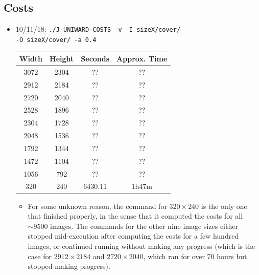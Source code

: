 \documentclass[11pt,a4paper]{report}
\begin{document}
\subsection{Costs}
\begin{itemize}
\item 10/11/18: \texttt{./J-UNIWARD-COSTS -v -I sizeX/cover/} \\
         \texttt{-O sizeX/cover/ -a 0.4}
  \begin{center}
  \begin{tabular}{ c c | c c }
  Width & Height & Seconds & Approx. Time \\ \hline
  3072 & 2304 & ?? & ?? \\  %
  2912 & 2184 & ?? & ?? \\  %
  2720 & 2040 & ?? & ?? \\  %
  2528 & 1896 & ?? & ?? \\  %
  2304 & 1728 & ?? & ?? \\  %
  2048 & 1536 & ?? & ?? \\  %
  1792 & 1344 & ?? & ?? \\  %
  1472 & 1104 & ?? & ?? \\  %
  1056 & 792 & ?? & ?? \\  %
  320 & 240 & 6430.11 & 1h47m \\
  \end{tabular}
  \end{center}

  \begin{itemize}
  \item For some unknown reason, the command for $320 \times 240$ is the only one that finished properly, in the sense that it computed the costs for all $\sim 9500$ images. The commands for the other nine image sizes either stopped mid-execution after computing the costs for a few hundred images, or continued running without making any progress (which is the case for $2912 \times 2184$ and $2720 \times 2040$, which ran for over 70 hours but stopped making progress).
  \end{itemize}


\end{itemize}
\end{document}
